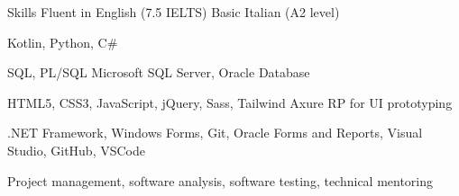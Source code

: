 
\begin{rubric}{Skills}
\entry*[Languages]
	Fluent in English (7.5 IELTS)
    Basic Italian (A2 level)

	Kotlin, Python, C\#

\entry*[Databases]
    SQL, PL/SQL
	Microsoft SQL Server, Oracle Database

	HTML5, CSS3, JavaScript, jQuery, Sass, Tailwind
    Axure RP for UI prototyping

	.NET Framework, Windows Forms, Git, Oracle Forms and Reports, Visual Studio, GitHub, VSCode

\entry*[Misc.]
	Project management, software analysis, software testing, technical mentoring

\end{rubric}

